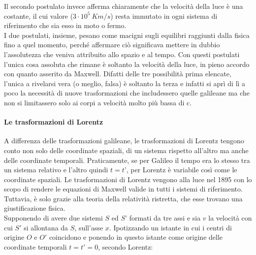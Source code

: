 \documentclass[a4paper,12pt]{report}
\begin{document}
Il secondo postulato invece afferma chiaramente che la velocità della luce è una costante, il cui valore ($3 \cdot 10^5\: Km/s$) resta immutato in ogni sistema di riferimento che sia esso in moto o fermo. \\

I due postulati, insieme, pesano come macigni sugli equilibri raggiunti dalla fisica fino a quel momento, perché affermare ciò significava mettere in dubbio l’assolutezza che veniva attribuito allo spazio e al tempo. Con questi postulati l’unica cosa assoluta che rimane è soltanto la velocità della luce, in pieno accordo con quanto asserito da Maxwell.
Difatti delle tre possibilità prima elencate, l’unica a rivelarsi vera (o meglio, falsa) è soltanto la terza e infatti si aprì di lì a poco la necessità di nuove trasformazioni che includessero quelle galileane ma che non si limitassero solo ai corpi a velocità molto più bassa di c.

\paragraph{Le trasformazioni di Lorentz}
A differenza delle trasformazioni galileane, le trasformazioni di Lorentz tengono conto non solo delle coordinate spaziali, di un sistema rispetto all’altro ma anche delle coordinate temporali.
Praticamente, se per Galileo il tempo era lo stesso tra un sistema relativo e l’altro quindi $t=t’$, per Lorentz è variabile così come le coordinate spaziali.
Le trasformazioni di Lorentz vengono alla luce nel 1895 con lo scopo di rendere le equazioni di Maxwell valide in tutti i sistemi di riferimento. Tuttavia, è solo grazie alla teoria della relatività ristretta, che esse trovano una giustificazione fisica.\\
Supponendo di avere due sistemi $S$ ed $S’$ formati da tre assi e sia $v$ la velocità con cui $S'$ si allontana da $S$, sull'asse $x$. Ipotizzando un istante in cui i centri di origine $O$ e $O'$ coincidono e ponendo in questo istante come origine delle coordinate temporali $t=t'=0$, secondo Lorentz:\\
\medskip 
\end{document}
